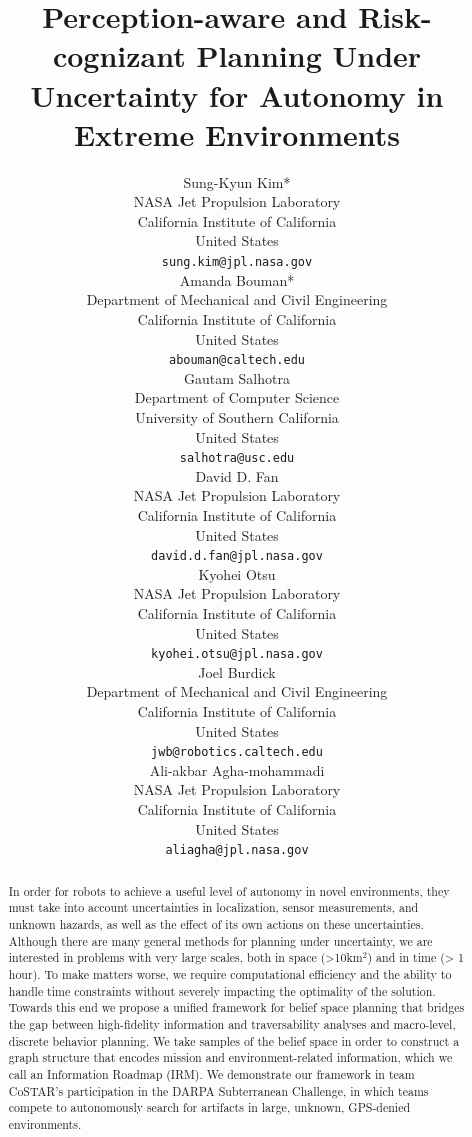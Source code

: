 \documentclass{article}
\title{
Perception-aware and Risk-cognizant Planning Under Uncertainty for Autonomy in Extreme Environments
}
\author{
  Sung-Kyun Kim*\\
  NASA Jet Propulsion Laboratory\\
  California Institute of California\\
  United States\\
  \texttt{sung.kim@jpl.nasa.gov} \\
  \And
  Amanda Bouman*\\
  Department of Mechanical and Civil Engineering\\
  California Institute of California\\
  United States\\
  \texttt{abouman@caltech.edu} \\
  \And
  Gautam Salhotra\\
  Department of Computer Science\\
  University of Southern California\\
  United States\\
  \texttt{salhotra@usc.edu} \\
  \And
  David D. Fan\\
  NASA Jet Propulsion Laboratory\\
  California Institute of California\\
  United States\\
  \texttt{david.d.fan@jpl.nasa.gov} \\
  \And
  Kyohei Otsu\\
  NASA Jet Propulsion Laboratory\\
  California Institute of California\\
  United States\\
  \texttt{kyohei.otsu@jpl.nasa.gov} \\
  \And
  Joel Burdick\\
  Department of Mechanical and Civil Engineering\\
  California Institute of California\\
  United States\\
  \texttt{jwb@robotics.caltech.edu} \\
  \And
  Ali-akbar Agha-mohammadi\\
  NASA Jet Propulsion Laboratory\\
  California Institute of California\\
  United States\\
  \texttt{aliagha@jpl.nasa.gov} \\
}
\newcommand{\ph}[1]{{\textbf{#1}:}} %
\begin{document}
\maketitle


\begin{abstract}
In order for robots to achieve a useful level of autonomy in novel environments, they must take into account uncertainties in localization, sensor measurements, and unknown hazards, as well as the effect of its own actions on these uncertainties.  Although there are many general methods for planning under uncertainty, we are interested in problems with very large scales, both in space (>10km$^2$) and in time (> 1 hour).  To make matters worse, we require computational efficiency and the ability to handle time constraints without severely impacting the optimality of the solution.  Towards this end we propose a unified framework for belief space planning that bridges the gap between high-fidelity information and traversability analyses and macro-level, discrete behavior planning.  We take samples of the belief space in order to construct a graph structure that encodes mission and environment-related information, which we call an Information Roadmap (IRM).  We demonstrate our framework in team CoSTAR's participation in the DARPA Subterranean Challenge, in which teams compete to autonomously search for artifacts in large, unknown, GPS-denied environments.
\end{abstract}






\end{document}
